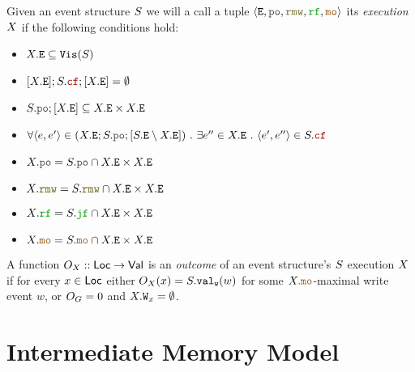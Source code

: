 \documentclass[12pt]{article}
\begin{document}
\begin{definition}
  Given an event structure $S$ we will a call a tuple $\tup{\lE, \lPO, \lRMW, \lRF, \lMO}$ 
  its \emph{execution} $X$ if the following conditions hold:
  \begin{itemize}
    \item $X.{\mathtt{E}} \subseteq {\mathtt{Vis}}(S)$
    \item $[\lX.\lE];\lES.\lCF;[\lX.\lE] = \emptyset$
    \item $\lES.\lPO;[\lX.\lE] \subseteq \lX.\lE \times \lX.\lE$
    \item $\forall{\tup{e, e'}} \in (\lX.\lE;\lES.\lPO;[\lES.\lE \setminus \lX.\lE]) ~.~ 
      \exists{e''} \in \lX.\lE ~.~ \tup{e', e''} \in \lES.\lCF$
    \item $\lX.\lPO = \lES.\lPO \cap \lX.\lE \times \lX.\lE$
    \item $\lX.\lRMW = \lES.\lRMW \cap \lX.\lE \times \lX.\lE$
    \item $\lX.\lRF = \lES.\lJF \cap \lX.\lE \times \lX.\lE$
    \item $\lX.\lMO = \lES.\lMO \cap \lX.\lE \times \lX.\lE$
  \end{itemize}
\end{definition}

\begin{definition}
  A function $O_{X} :: \mathsf{Loc} \rightarrow \mathsf{Val}$ is an \emph{outcome} 
  of an event structure's $S$ execution $X$
  if for every $x \in \mathsf{Loc}$ either $O_{X}(x) = S.{\mathtt{val_w}}(w)$ 
  for some $\lX.\lMO$-maximal write event $w$, 
  or $O_{G} = 0$ and $X.{\mathtt{W}}_x = \emptyset$.
\end{definition}

\section{Intermediate Memory Model}
\end{document}
